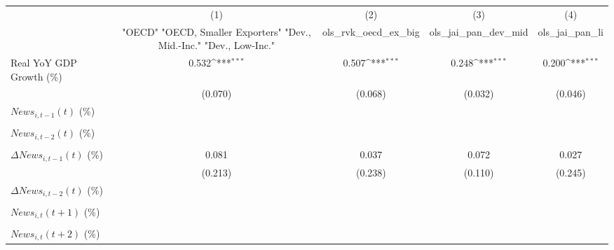 {
\def\sym#1{\ifmmode^{#1}\else\(^{#1}\)\fi}
\begin{tabular}{l*{4}{c}}
\toprule
                    &\multicolumn{1}{c}{(1)}&\multicolumn{1}{c}{(2)}&\multicolumn{1}{c}{(3)}&\multicolumn{1}{c}{(4)}\\
                    &\multicolumn{1}{c}{ "OECD" "OECD, Smaller Exporters" "Dev., Mid.-Inc." "Dev., Low-Inc."}&\multicolumn{1}{c}{ols_rvk_oecd_ex_big}&\multicolumn{1}{c}{ols_jai_pan_dev_mid}&\multicolumn{1}{c}{ols_jai_pan_li}\\
\midrule
Real YoY GDP Growth (\%)&       0.532\sym{***}&       0.507\sym{***}&       0.248\sym{***}&       0.200\sym{***}\\
                    &     (0.070)         &     (0.068)         &     (0.032)         &     (0.046)         \\
\addlinespace
$ News_{i,t-1}(t)$ (\%)&                     &                     &                     &                     \\
                    &                     &                     &                     &                     \\
\addlinespace
$ News_{i,t-2}(t)$ (\%)&                     &                     &                     &                     \\
                    &                     &                     &                     &                     \\
\addlinespace
$ \Delta News_{i,t-1}(t)$ (\%)&       0.081         &       0.037         &       0.072         &       0.027         \\
                    &     (0.213)         &     (0.238)         &     (0.110)         &     (0.245)         \\
\addlinespace
$ \Delta News_{i,t-2}(t)$ (\%)&                     &                     &                     &                     \\
                    &                     &                     &                     &                     \\
\addlinespace
$ News_{i,t}(t+1)$ (\%)&                     &                     &                     &                     \\
                    &                     &                     &                     &                     \\
\addlinespace
$ News_{i,t}(t+2)$ (\%)&                     &                     &                     &                     \\

\end{tabular}}
